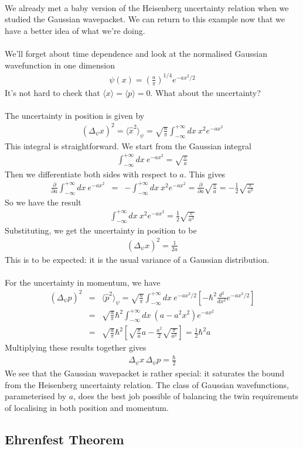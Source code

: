 \documentclass[12pt]{article}
\def\be{\begin{eqnarray}}
\def\ee{\end{eqnarray}}
\newcommand{\nn}{\nonumber}
\newcommand\para{\paragraph{}}
\newcommand{\ppp}[2]{\frac{\partial {#1}}{\partial {#2}}}
\begin{document}
{\para
We already met a baby version of the Heisenberg uncertainty relation when we studied the Gaussian wavepacket. We can return to this example now that we have a better idea of what we're doing.

\para
We'll forget about time dependence  and look at the normalised Gaussian wavefunction in one dimension
%
\be \psi(x) = \left(\frac{a}{\pi}\right)^{1/4} e^{-ax^2/2}\nn\ee
%
It's not hard to check that $\langle{x}\rangle = \langle{p}\rangle=0$. What about the uncertainty?

\para
The uncertainty in position is given by 
%
\be (\Delta_\psi x)^2 = \langle \hat{x}^2\rangle_\psi = \sqrt{\frac{a}{\pi}}\int_{-\infty}^{+\infty} dx\ x^2 e^{-ax^2}\nn\ee
%
This integral is straightforward. We start from the Gaussian integral
%
\be \int_{-\infty}^{+\infty} dx\ e^{-ax^2} = \sqrt{\frac{\pi}{a}}\nn\ee
%
Then we differentiate both sides with respect to $a$. This gives
%
\be  \ppp{}{a}\int_{-\infty}^{+\infty} dx\ e^{-ax^2} &=& - \int_{-\infty}^{+\infty} dx\ x^2e^{-ax^2} = \ppp{}{a} \sqrt{\frac{\pi}{a}} = -\frac{1}{2}\sqrt{\frac{\pi}{a^3}}\nn\ee
%
So we have the result
%
\be \int_{-\infty}^{+\infty} dx\ x^2e^{-ax^2} =  \frac{1}{2}\sqrt{\frac{\pi}{a^3}}\nn\ee
%
Substituting, we get the uncertainty in position to be
%
\be (\Delta_\psi x)^2 = \frac{1}{2a}\nn\ee
%
This is to be expected: it is the usual variance of a Gaussian distribution.


\para
For the uncertainty in momentum, we have
%
\be (\Delta_\psi p)^2 &=&\langle \hat{p}^2\rangle_\psi =  \sqrt{\frac{a}{\pi}}\int_{-\infty}^{+\infty} dx\ e^{-ax^2/2}\left[-\hbar^2 \frac{d^2}{dx^2}e^{-ax^2/2}\right]\nn\\ &=& 
\sqrt{\frac{a}{\pi}} \hbar^2 \int_{-\infty}^{+\infty} dx\ (a-a^2x^2) e^{-ax^2} \nn\\ 
&=& \sqrt{\frac{a}{\pi}} \hbar^2 \left[\sqrt{\frac{\pi}{a}}a-\frac{a^2}{2}\sqrt{\frac{\pi}{a^3}}\right] = \frac{1}{2}\hbar^2 a
\nn\ee
%
Multiplying these results together gives
%
\be \Delta_\psi x\,\Delta_\psi p = \frac{\hbar}{2}\nn\ee
%
We see that the Gaussian wavepacket is rather special: it saturates the bound from the Heisenberg uncertainty relation. The class of Gaussian wavefunctions, parameterised by $a$, does the best job possible of balancing the twin requirements of localising in both position and momentum.







\subsection{Ehrenfest Theorem}


}
\end{document}
